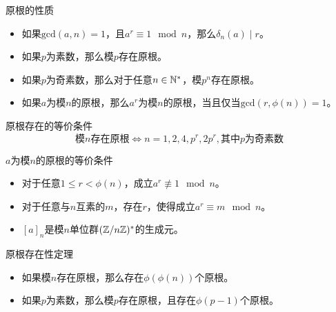 \begin{proposition}{原根的性质}
	\begin{itemize}
		\item 如果$\mathrm{gcd}(a,n)=1$，且$a^r\equiv 1\mod n$，那么$\delta_n(a)\mid r$。
		\item 如果$p$为素数，那么模$p$存在原根。
		\item  如果$p$为奇素数，那么对于任意$n\in\mathbb{N}^*$，模$p^n$存在原根。
		\item 如果$a$为模$n$的原根，那么$a^r$为模$n$的原根，当且仅当$\mathrm{gcd}(r,\phi(n))=1$。
	\end{itemize}
\end{proposition}

\begin{theorem}{原根存在的等价条件}
	$$
	\text{模}n\text{存在原根}\iff n=1,2,4,p^r,2p^r, \text{其中} p \text{为奇素数}
	$$
\end{theorem}

\begin{theorem}{$a$为模$n$的原根的等价条件}
	\begin{itemize}
		\item 对于任意$1\le r<\phi(n)$，成立$a^r\not\equiv 1\mod n$。
		\item 对于任意与$n$互素的$m$，存在$r$，使得成立$a^r\equiv m\mod n$。
		\item $[a]_{n}$是模$n$单位群$(\mathbb{Z}/n\mathbb{Z})^*$的生成元。
	\end{itemize}
\end{theorem}

\begin{theorem}{原根存在性定理}
	\begin{itemize}
		\item 如果模$n$存在原根，那么存在$\phi(\phi(n))$个原根。
		\item 如果$p$为素数，那么模$p$存在原根，且存在$\phi(p-1)$个原根。
	\end{itemize}
\end{theorem}

